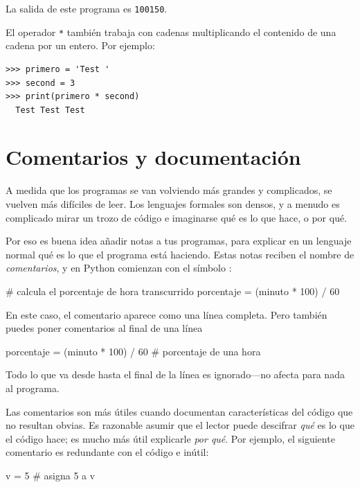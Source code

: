 La salida de este programa es \texttt{100150}.

El operador \texttt{*} también trabaja con cadenas multiplicando el
contenido de una cadena por un entero. Por ejemplo:

\begin{Verbatim}[frame=single]
>>> primero = 'Test '
>>> second = 3
>>> print(primero * second)
  Test Test Test
\end{Verbatim}

\hypertarget{comentarios}{%
\section{Comentarios y documentación}\label{comentarios}}


A medida que los programas se van volviendo más grandes y complicados,
se vuelven más difíciles de leer. Los lenguajes formales son densos, y a
menudo es complicado mirar un trozo de código e imaginarse qué es lo que
hace, o por qué.

Por eso es buena idea añadir notas a tus programas, para explicar en un lenguaje normal qué es lo que el programa está haciendo. Estas notas
reciben el nombre de \emph{comentarios}, y en Python comienzan con el
símbolo \pythoninline{#}:

\begin{python}[frame=single]
# calcula el porcentaje de hora transcurrido
porcentaje = (minuto * 100) / 60
\end{python}

En este caso, el comentario aparece como una línea completa. Pero
también puedes poner comentarios al final de una línea

\begin{python}[frame=single]
porcentaje = (minuto * 100) / 60     # porcentaje de una hora
\end{python}

Todo lo que va desde \pythoninline{#} hasta el final de la
línea es ignorado---no afecta para nada al programa.

Las comentarios son más útiles cuando documentan características del
código que no resultan obvias. Es razonable asumir que el lector puede
descifrar \emph{qué} es lo que el código hace; es mucho más útil
explicarle \emph{por qué}. Por ejemplo, el siguiente comentario es redundante con el código e inútil:

\begin{python}[frame=single]
v = 5     # asigna 5 a v
\end{python}

